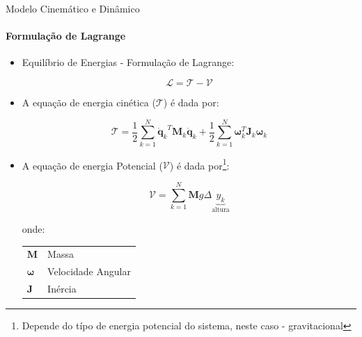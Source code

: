 \documentclass{beamer}
\begin{document}
\begin{frame}{Modelo Cinemático e Dinâmico}
    \framesubtitle{Formulação de Lagrange}

    \begin{itemize}

        \item Equilíbrio de Energias - Formulação de Lagrange:

              \begin{equation}
                  \mathcal{L}= \mathcal{T} - \mathcal{V}
              \end{equation}

        \item A equação de energia cinética ($\mathcal{T}$) é dada por:

            \begin{equation}
                \mathcal{T} = \frac{1}{2} \sum\limits_{k=1}^{N}{\mathbf{\dot{q}}_k}^T  \mathbf{M}_k {\mathbf{\dot{q}}_k}+ \frac{1}{2} \sum\limits_{k=1}^{N}\mathbf{\omega}_k^T \mathbf{J}_k \mathbf{\omega}_k
            \end{equation}

        \item A equação de energia Potencial ($\mathcal{V}$) é dada por\footnote{Depende do típo de energia potencial do sistema, neste caso - gravitacional}:

            \begin{equation}
                \mathcal{V} = \sum\limits_{k=1}^{N}\mathbf{M}g\Delta \underbrace{y_k}_{\text{altura}}
            \end{equation}  


              \begin{block}{}
                  \scriptsize{
                      onde:
                      \begin{tabular}{l|l}
                          $\mathbf{M}$               & Massa              \\
                          $\mathbf{\omega}$ & Velocidade Angular \\
                          $\mathbf{J}$               & Inércia         \\
                      \end{tabular}}
              \end{block}
    \end{itemize}
\end{frame}
\end{document}
